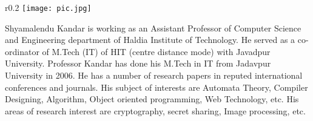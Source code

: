 \documentclass{book}
\begin{document}
\begin{wrapfigure}[9]{r}{0.2\textwidth}
    \texttt{[image: pic.jpg]}
\end{wrapfigure}Shyamalendu Kandar is working as an Assistant Professor of Computer
Science and Engineering department of Haldia Institute of Technology.
He served as a co-ordinator of M.Tech (IT) of HIT (centre distance mode)
with Javadpur University. Professor Kandar has done his M.Tech in IT
from Jadavpur University in 2006. He has a number of research papers
in reputed international conferences and journals. His subject of interests
are Automata Theory, Compiler Designing, Algorithm, Object oriented
programming, Web Technology, etc. His areas of research interest are
cryptography, secret sharing, Image processing, etc.
\end{document}
